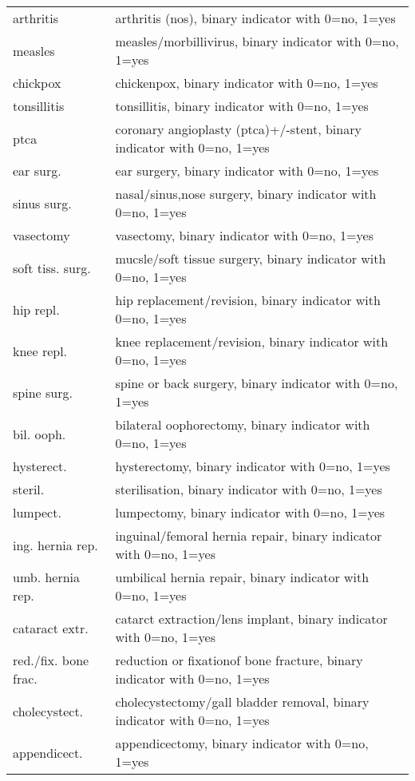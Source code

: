 \begin{longtable}[c]{lp{8cm}}
        arthritis	&	arthritis (nos), binary indicator with 0=no, 1=yes	\\
        measles	&	measles/morbillivirus, binary indicator with 0=no, 1=yes	\\
        chickpox	&	chickenpox, binary indicator with 0=no, 1=yes	\\
        tonsillitis	&	tonsillitis, binary indicator with 0=no, 1=yes	\\
        ptca	&	coronary angioplasty (ptca)+/-stent, binary indicator with 0=no, 1=yes	\\
        ear surg.	&	ear surgery, binary indicator with 0=no, 1=yes	\\
        sinus surg.	&	nasal/sinus,nose surgery, binary indicator with 0=no, 1=yes	\\
        vasectomy	&	vasectomy, binary indicator with 0=no, 1=yes	\\
        soft tiss. surg.	&	mucsle/soft tissue surgery, binary indicator with 0=no, 1=yes	\\
        hip repl.	&	hip replacement/revision, binary indicator with 0=no, 1=yes	\\
        knee repl.	&	knee replacement/revision, binary indicator with 0=no, 1=yes	\\
        spine surg.	&	spine or back surgery, binary indicator with 0=no, 1=yes	\\
        bil. ooph.	&	bilateral oophorectomy, binary indicator with 0=no, 1=yes	\\
        hysterect.	&	hysterectomy, binary indicator with 0=no, 1=yes	\\
        steril.	&	sterilisation, binary indicator with 0=no, 1=yes	\\
        lumpect.	&	lumpectomy, binary indicator with 0=no, 1=yes	\\
        ing. hernia rep.	&	inguinal/femoral hernia repair, binary indicator with 0=no, 1=yes	\\
        umb. hernia rep.	&	umbilical hernia repair, binary indicator with 0=no, 1=yes	\\
        cataract extr.	&	catarct extraction/lens implant, binary indicator with 0=no, 1=yes	\\
        red./fix. bone frac.	&	reduction or fixationof bone fracture, binary indicator with 0=no, 1=yes	\\
         cholecystect. 	&	cholecystectomy/gall bladder removal, binary indicator with 0=no, 1=yes	\\
        appendicect.	&	appendicectomy, binary indicator with 0=no, 1=yes	\\

\end{longtable}
